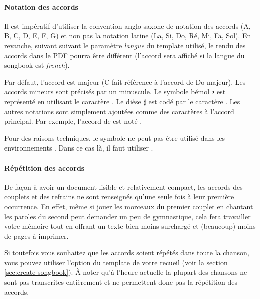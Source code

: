 \paragraph{Notation des accords}
Il est impératif d'utiliser la convention anglo-saxone de notation des
accords (A, B, C, D, E, F, G) et non pas la notation latine (La, Si,
Do, Ré, Mi, Fa, Sol). En revanche, suivant suivant le paramètre
\emph{langue} du template utilisé, le rendu des accords dans le PDF
pourra être différent (l'accord \latexcom{[D]} sera affiché
 si la langue du songbook est \emph{french}).

Par défaut, l'accord est majeur (C fait référence à l'accord de Do
majeur). Les accords mineurs sont précisés par un 
minuscule.  Le symbole bémol $\flat$ est représenté en utilisant le
caractère \command{\&}. Le dièse $\sharp$ est codé par le caractère
\command{\#}. Les autres notations sont simplement ajoutées comme des
caractères à l'accord principal. Par exemple, l'accord de  est noté \latexcom{[A\&m]}.

\begin{nota}
  Pour des raisons techniques, le symbole \command{\#} ne peut pas
  être utilisé dans les environnements . Dans ce
  cas là, il faut utiliser .
\end{nota}

\paragraph{Répétition des accords}
De façon à avoir un document lisible et relativement compact, les
accords des couplets et des refrains ne sont renseignés qu'une seule
fois à leur première occurrence. En effet, même si jouer les morceaux
du premier couplet en chantant les paroles du second peut demander un
peu de gymnastique, cela fera travailler votre mémoire tout en offrant
un texte bien moins surchargé et (beaucoup) moins de pages à imprimer.

Si toutefois vous souhaitez que les accords soient répétés dans toute la
chanson, vous pouvez utiliser l'option  du
template de votre recueil (voir la section \ref{sec:create-songbook}).
À noter qu'à l'heure actuelle la plupart des chansons ne sont pas
transcrites entièrement et ne permettent donc pas la répétition des
accords.

